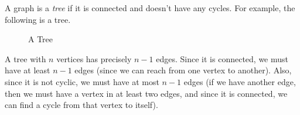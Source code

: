 \documentclass[a4paper, openany]{memoir}
\begin{document}
\noindent A graph is a \emph{tree} if it is connected and doesn't have any cycles. For example, the following is a tree.
\begin{figure}[H]
    \centering
    \caption{A Tree}
\end{figure}
A tree with $n$ vertices has precisely $n-1$ edges. Since it is connected, we must have at least $n-1$ edges (since we can reach from one vertex to another). Also, since it is not cyclic, we must have at most $n-1$ edges (if we have another edge, then we must have a vertex in at least two edges, and since it is connected, we can find a cycle from that vertex to itself).
\end{document}
